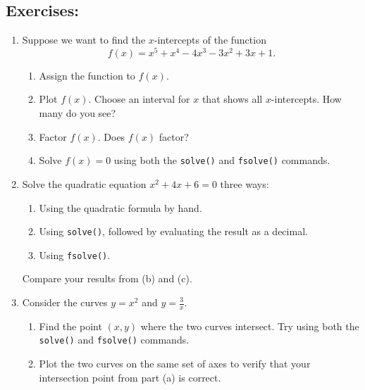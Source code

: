 \subsection*{Exercises:}
\begin{enumerate} 
    \item Suppose we want to find the $x$-intercepts of the function \[ f(x) = x^5+x^4-4x^3-3x^2+3x+1.\] 
    \begin{enumerate}
        	\item Assign the function to $f(x)$.  
    	\item Plot $f(x)$. Choose an interval for $x$ that shows all $x$-intercepts. How many do you see?
    	\item Factor $f(x)$. Does $f(x)$ factor? 
    	\item Solve $f(x)=0$ using both the \texttt{solve()} and \texttt{fsolve()} commands.
    		
    \end{enumerate}
    \item Solve the quadratic equation $x^2+4x+6=0$ three ways:
    
    \begin{enumerate}
    	\item Using the quadratic formula by hand. 
    	\item Using \texttt{solve()}, followed by evaluating the result as a decimal.
    	\item Using \texttt{fsolve()}.
    \end{enumerate}
    Compare your results from (b) and (c).

    \item Consider the curves $y=x^2$ and $y=\frac{3}{x}$.
    \begin{enumerate}
    \item Find the point $(x,y)$ where the two curves intersect. Try using both the \texttt{solve()} and \texttt{fsolve()} commands.
    
    \item Plot the two curves on the same set of axes to verify that your intersection point from part (a) is correct.
	\end{enumerate}     
    
\end{enumerate}